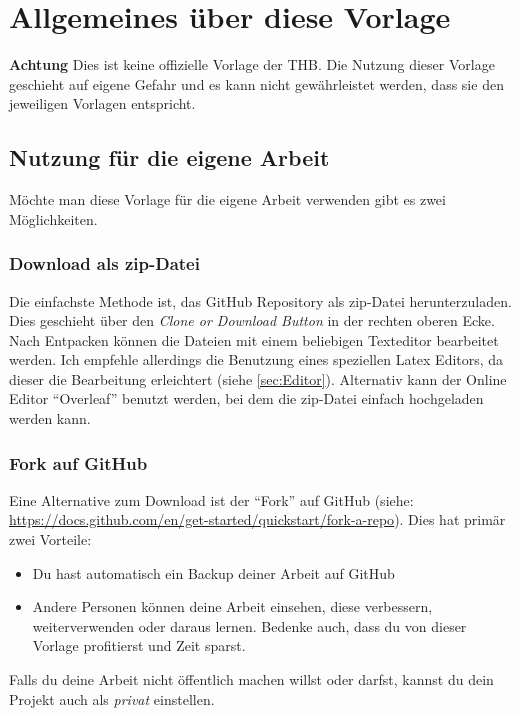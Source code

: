 \chapter{Allgemeines über diese Vorlage}
\begin{Large}
\textbf{Achtung}\quad
Dies ist keine offizielle Vorlage der THB. Die Nutzung dieser Vorlage geschieht auf eigene Gefahr und es kann nicht gewährleistet werden, dass sie den jeweiligen Vorlagen entspricht.
\end{Large}

\section{Nutzung für die eigene Arbeit}
Möchte man diese Vorlage für die eigene Arbeit verwenden gibt es zwei Möglichkeiten.

\subsection{Download als zip-Datei}
Die einfachste Methode ist, das GitHub Repository als zip-Datei herunterzuladen. Dies geschieht über den \textit{Clone or Download Button} in der rechten oberen Ecke. Nach Entpacken können die Dateien mit einem beliebigen Texteditor bearbeitet werden. Ich empfehle allerdings die Benutzung eines speziellen Latex Editors, da dieser die Bearbeitung erleichtert (siehe \vref{sec:Editor}). Alternativ kann der Online Editor \enquote{Overleaf} \cite{OverleafWebsite} benutzt werden, bei dem die zip-Datei einfach hochgeladen werden kann.

\subsection{Fork auf GitHub}
Eine Alternative zum Download ist der \enquote{Fork} auf GitHub (siehe: \url{https://docs.github.com/en/get-started/quickstart/fork-a-repo}). Dies hat primär zwei Vorteile:
\begin{itemize}
	\item Du hast automatisch ein Backup deiner Arbeit auf GitHub
	\item Andere Personen können deine Arbeit einsehen, diese verbessern, weiterverwenden oder daraus lernen. Bedenke auch, dass du von dieser Vorlage profitierst und Zeit sparst.
\end{itemize}
Falls du deine Arbeit nicht öffentlich machen willst oder darfst, kannst du dein Projekt auch als \textit{privat} einstellen.

